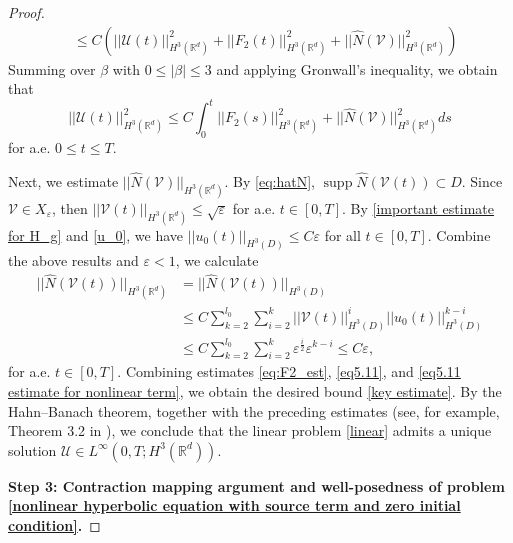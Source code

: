 \documentclass[11pt,reqno,oneside]{amsart}
\numberwithin{equation}{section}
\theoremstyle{definition}
\theoremstyle{remark}
\numberwithin{equation}{section}
\begin{document}
\begin{proof}
\begin{equation}
\begin{aligned}
			&\leqslant C \left(|| \mathscr{U}(t)||^{2}_{H^{3}(\mathbb{R}^d)}+||F_2(t)||^{2}_{H^{3}(\mathbb{R}^d)}+||\hat{N}(\mathscr{V})||^{2}_{H^{3}(\mathbb{R}^d)}\right)
			\end{aligned}
		\end{equation}
			Summing over $\beta$ with $0\leqslant|\beta| \leqslant 3$  and applying Gronwall's inequality, we obtain that
		\begin{equation}\label{eq5.11}
			||\mathscr{U}(t)||^2_{H^{3}(\mathbb{R}^d)}\leqslant C \int_{0}^{t}|| F_2(s)||^{2}_{H^{3}(\mathbb{R}^d)}+||\hat{N}(\mathscr{V})||^{2}_{H^{3}(\mathbb{R}^d)}ds
		\end{equation}
		for a.e. $ 0\leqslant t\leqslant T$.
		
		Next, we estimate $||\hat{N}(\mathscr{V})||_{H^{3}(\mathbb{R}^d)}$. By \eqref{eq:hatN},
		$\operatorname{supp}\hat{N}(\mathscr{V}(t))\subset D$. Since $\mathscr{V}\in X_{\varepsilon}$, then $||\mathscr{V}(t)||_{H^3(\mathbb{R}^d)}\leqslant \sqrt{\varepsilon}$ for a.e. $t\in[0,T]$. By \eqref{important estimate for H_g} and \eqref{u_0}, we have $||u_0(t)||_{H^3(D)}\leqslant C\varepsilon$ for all $t \in [0,T]$. Combine the above results and $\varepsilon <1$, we calculate
		\begin{equation}\label{eq5.11 estimate for nonlinear term}
			\begin{aligned}
				||\hat{N}(\mathscr{V}(t))||_{H^{3}(\mathbb{R}^d)}&=	||\hat{N}(\mathscr{V}(t))||_{H^{3}(D)}\\
				&\leqslant C\sum_{k=2}^{l_0}\sum_{i=2}^{k} ||\mathscr{V}(t)||^{i}_{H^{3}(D)}||u_0(t)||^{k-i}_{H^{3}(D)}\\
				&\leqslant C \sum_{k=2}^{l_0}\sum_{i=2}^{k} \varepsilon^{\frac{i}{2}}\varepsilon^{k-i}\leqslant C \varepsilon,
			\end{aligned}
		\end{equation} 
		for a.e. $t \in [0,T]$. Combining estimates \eqref{eq:F2_est}, \eqref{eq5.11}, and \eqref{eq5.11 estimate for nonlinear term}, we obtain the desired bound \eqref{key estimate}. By the Hahn–Banach theorem, together with the preceding estimates (see, for example, Theorem 3.2 in \cite{Sogge}), we conclude that the linear problem \eqref{linear} admits a unique solution $\mathscr{U}\in L^{\infty}(0,T; H^{3}(\mathbb{R}^d)).$
		
		

		
		\medskip
		\textbf{Step 3: Contraction mapping argument and well-posedness of problem \eqref{nonlinear hyperbolic equation with source term and zero initial condition}.}
		

\end{proof}
\end{document}
